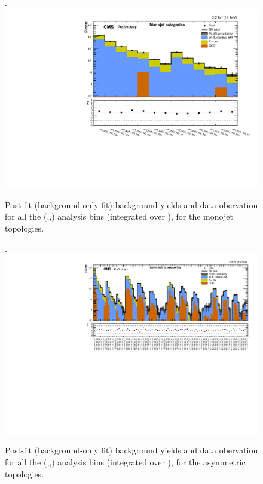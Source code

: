\clearpage
\begin{landscape}
  \begin{center}
    \begin{figure}[h!]
      \caption{Post-fit (background-only fit) background yields and data obervation for all the (\njet,\nb,\scalht) analysis bins (integrated over \MHT), for the monojet topologies. \label{fig:summaryPlot_fit_b_Monojet}}.
      \includegraphics[width=0.8\linewidth]{figures/postFitResults/summaryPlots/summaryPlot_fit_b_Monojet}
    \end{figure}
  \end{center}
\end{landscape}

\clearpage
\begin{landscape}
  \begin{center}
    \begin{figure}[h!]
      \caption{Post-fit (background-only fit) background yields and data obervation for all the (\njet,\nb,\scalht) analysis bins (integrated over \MHT), for the asymmetric topologies. \label{fig:summaryPlot_fit_b_Asymmetric}}.
      \includegraphics[width=0.8\linewidth]{figures/postFitResults/summaryPlots/summaryPlot_fit_b_Asymmetric}
    \end{figure}
  \end{center}
\end{landscape}

